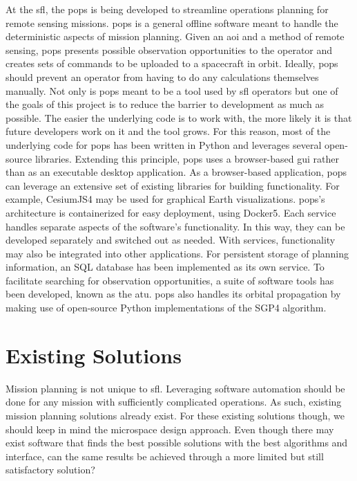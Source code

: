 At the \gls{sfl}, the \gls{pops} is being developed to streamline operations
planning for remote sensing missions. \gls{pops} is a general offline software
meant to handle the deterministic aspects of mission planning.  Given an
\gls{aoi} and a method of remote sensing, \gls{pops} presents possible
observation opportunities to the operator and creates sets of commands to be
uploaded to a spacecraft in orbit.  Ideally, \gls{pops} should prevent an
operator from having to do any calculations themselves manually. Not only is
\gls{pops} meant to be a tool used by \gls{sfl} operators but one of the goals
of this project is to reduce the barrier to development as much as possible.
The easier the underlying code is to work with, the more likely it is that
future developers work on it and the tool grows. For this reason, most of the
underlying code for \gls{pops} has been written in Python and leverages several
open-source libraries.  Extending this principle, \gls{pops} uses a
browser-based \gls{gui} rather than as an executable desktop application. As a
browser-based application, \gls{pops} can leverage an extensive set of existing
libraries for building functionality.  For example, CesiumJS4 may be used for
graphical Earth visualizations.  \gls{pops}’s architecture is containerized for
easy deployment, using Docker5.  Each service handles separate aspects of the
software’s functionality.  In this way, they can be developed separately and
switched out as needed. With services, functionality may also be integrated
into other applications. For persistent storage of planning information, an SQL
database has been implemented as its own service.  To facilitate searching for
observation opportunities, a suite of software tools has been developed, known
as the \gls{atu}.  \gls{pops} also handles its orbital propagation by making use of
open-source Python implementations of the SGP4 algorithm. 


\section{Existing Solutions}\label{sec:exsoln}

Mission planning is not unique to \gls{sfl}. Leveraging software automation
should be done for any mission with sufficiently complicated operations.  As
such, existing mission planning solutions already exist. For these existing
solutions though, we should keep in mind the microspace design approach. Even
though there may exist software that finds the best possible solutions with the
best algorithms and interface, can the same results be achieved through a more
limited but still satisfactory solution? 


